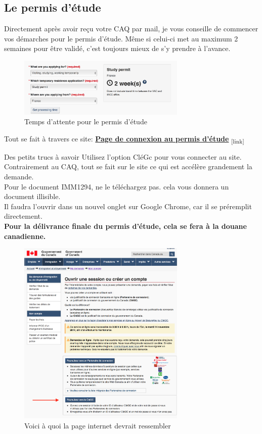 \subsection{Le permis d'étude}\label{sec:sec3.2.6}
Directement après avoir reçu votre CAQ par mail, je vous conseille de commencer vos démarches pour le permis d'étude. Même si celui-ci met au maximum 2 semaines pour être validé, c'est toujours mieux de s'y prendre à l'avance.

\begin{figure}[h!]
\centering
\includegraphics[width = 80mm]{figures/Processing_Time_SP}
\caption{Temps d'attente pour le permis d'étude}
\end{figure}

Tout se fait à travers ce site:
\bigbreak
\href{http://www.cic.gc.ca/francais/services-e/compte.asp}{\textbf{Page de connexion au permis d'étude}}\textsubscript{  [link]}
\bigbreak

\begin{example}{Des petits trucs à savoir}
  Utilisez l'option CléGc pour vous connecter au site.
  Contrairement au CAQ, tout se fait sur le site ce qui est accélère grandement la demande. \\
  Pour le document IMM1294, ne le téléchargez pas. cela vous donnera un document illisible. \\
  Il faudra l'ouvrir dans un nouvel onglet sur Google Chrome, car il se préremplit directement. \\
  \textbf{Pour la délivrance finale du permis d'étude, cela se fera à la douane canadienne.}
\end{example}

\begin{figure}[h!]
\centering
\includegraphics[width = 80mm]{figures/Site_Permis_Etude}
\caption{Voici à quoi la page internet devrait ressembler}
\end{figure}



